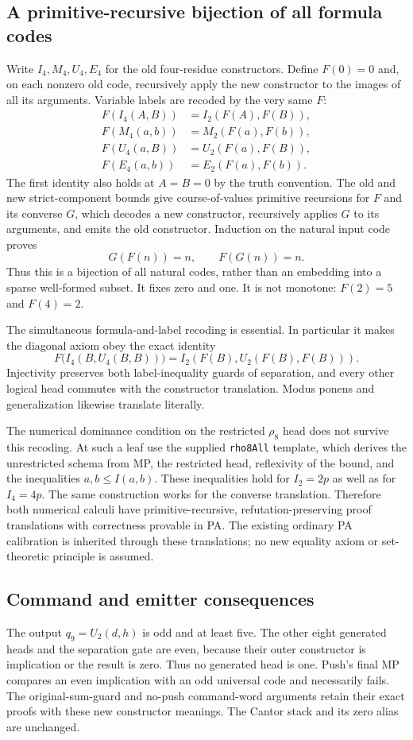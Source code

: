 \subsection{A primitive-recursive bijection of all formula codes}
Write $I_4,M_4,U_4,E_4$ for the old four-residue constructors.  Define
$F(0)=0$ and, on each nonzero old code, recursively apply the new
constructor to the images of all its arguments.  Variable labels are
recoded by the very same $F$:
\begin{align*}
 F(I_4(A,B))&=I_2(F(A),F(B)),\\
 F(M_4(a,b))&=M_2(F(a),F(b)),\\
 F(U_4(a,B))&=U_2(F(a),F(B)),\\
 F(E_4(a,b))&=E_2(F(a),F(b)).
\end{align*}
The first identity also holds at $A=B=0$ by the truth convention.
The old and new strict-component bounds give course-of-values primitive
recursions for $F$ and its converse $G$, which decodes a new constructor,
recursively applies $G$ to its arguments, and emits the old constructor.
Induction on the natural input code proves
\[
                         G(F(n))=n,\qquad F(G(n))=n.
\]
Thus this is a bijection of all natural codes, rather than an embedding
into a sparse well-formed subset.  It fixes zero and one.  It is not
monotone: $F(2)=5$ and $F(4)=2$.

The simultaneous formula-and-label recoding is essential.  In particular
it makes the diagonal axiom obey the exact identity
\[
 F\bigl(I_4(B,U_4(B,B))\bigr)
       =I_2(F(B),U_2(F(B),F(B))).
\]
Injectivity preserves both label-inequality guards of separation, and
every other logical head commutes with the constructor translation.
Modus ponens and generalization likewise translate literally.

The numerical dominance condition on the restricted $\rho_8$ head does
not survive this recoding.  At such a leaf use the supplied
\texttt{rho8All} template, which derives the unrestricted schema from
MP, the restricted head, reflexivity of the bound, and the inequalities
$a,b\le I(a,b)$.  These inequalities hold for $I_2=2p$ as well as
for $I_4=4p$.  The same construction works for the converse translation.
Therefore both numerical calculi have primitive-recursive,
refutation-preserving proof translations with correctness provable in PA.
The existing ordinary PA calibration is inherited through these
translations; no new equality axiom or set-theoretic principle is assumed.

\subsection{Command and emitter consequences}
The output $q_9=U_2(d,h)$ is odd and at least five.  The other eight
generated heads and the separation gate are even, because their outer
constructor is implication or the result is zero.  Thus no generated
head is one.  Push's final MP compares an even implication with an odd
universal code and necessarily fails.  The original-sum-guard and
no-push command-word arguments retain their exact proofs with these
new constructor meanings.  The Cantor stack and its zero alias are
unchanged.

